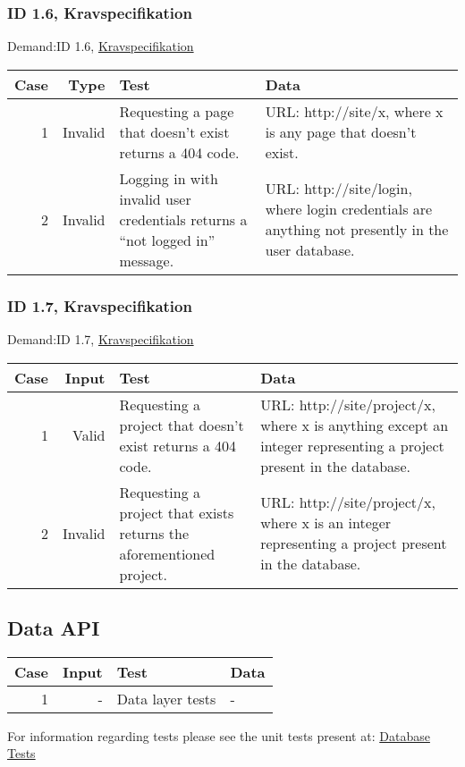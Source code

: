 \documentclass{TDP003mall}
\begin{document}
\subsubsection{ID 1.6, Kravspecifikation}
Demand:ID 1.6, \href{https://www.ida.liu.se/~TDP003/current/projekt/dokument/systemspecifikation.pdf}{Kravspecifikation}
\begin{table}[!h]
\begin{tabularx}{\linewidth}{|r|r|X|X|}\hline
\textbf{Case} & \textbf{Type} & \textbf{Test} & \textbf{Data} \\\hline
1 &Invalid & Requesting a page that doesn't exist returns a 404 code.  & URL: http://site/x, where x is any page that doesn't exist. \\\hline
2 &Invalid & Logging in with invalid user credentials returns a ``not logged in'' message. & URL: http://site/login, where login credentials are anything not presently in the user database. \\\hline
\end{tabularx}
\end{table}



\subsubsection{ID 1.7, Kravspecifikation}
Demand:ID 1.7, \href{https://www.ida.liu.se/~TDP003/current/projekt/dokument/systemspecifikation.pdf}{Kravspecifikation}
\begin{table}[!h]
\begin{tabularx}{\linewidth}{|r|r|X|X|}\hline
\textbf{Case} &\textbf{Input} & \textbf{Test} & \textbf{Data} \\\hline
1 &Valid & Requesting a project that doesn't exist returns a 404 code.  & URL: http://site/project/x, where x is anything except an integer representing a project present in the database. \\\hline
2 &Invalid & Requesting a project that exists returns the aforementioned project.  & URL: http://site/project/x, where x is an integer representing a project present in the database. \\\hline
\end{tabularx}
\end{table}

\subsection{Data API}
\begin{table}[!h]
\begin{tabularx}{\linewidth}{|r|r|X|X|}\hline
\textbf{Case} &\textbf{Input} & \textbf{Test} & \textbf{Data} \\\hline
1 & -  & Data layer tests  & - \\\hline
\end{tabularx}
\end{table}
For information regarding tests
please see the unit tests present at: \href{https://gitlab.ida.liu.se/filst04/tdp003-2018-database-tests}{Database Tests}
\newpage
\end{document}
